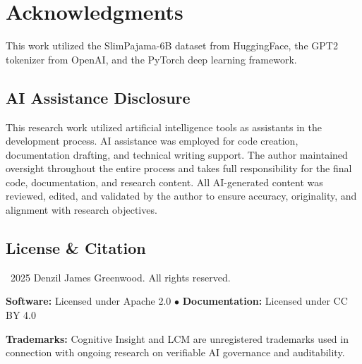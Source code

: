 \documentclass[11pt,a4paper]{article}
\begin{document}
\section{Acknowledgments}

This work utilized the SlimPajama-6B dataset from HuggingFace, the GPT2 tokenizer from OpenAI, and the PyTorch deep learning framework.

\subsection*{AI Assistance Disclosure}

This research work utilized artificial intelligence tools as assistants in the development process. AI assistance was employed for code creation, documentation drafting, and technical writing support. The author maintained oversight throughout the entire process and takes full responsibility for the final code, documentation, and research content. All AI-generated content was reviewed, edited, and validated by the author to ensure accuracy, originality, and alignment with research objectives.

\subsection*{License \& Citation}

\textcopyright~2025 Denzil James Greenwood. All rights reserved.

\textbf{Software:} Licensed under Apache 2.0 \quad $\bullet$ \quad \textbf{Documentation:} Licensed under CC BY 4.0

\textbf{Trademarks:} Cognitive Insight\texttrademark{} and LCM\texttrademark{} are unregistered trademarks used in connection with ongoing research on verifiable AI governance and auditability.
\end{document}
